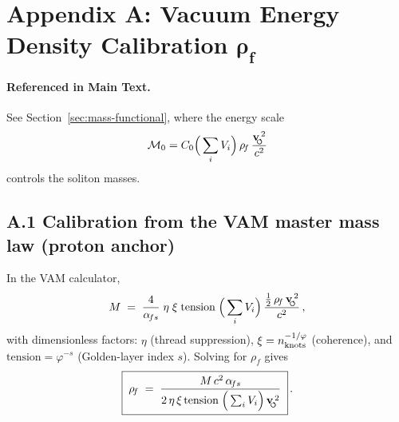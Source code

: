 \documentclass[11pt, preprint,titlepage]{revtex4-2}
\newcommand{\rhoF}{\rho_{\!f}}      %
\newcommand{\swirlarrow}{\!\!\scriptsize\boldsymbol{\circlearrowleft}}
\newcommand{\vswirl}{\mathbf{v}_{\swirlarrow}}
\begin{document}
    
    

    \appendix
	\section*{Appendix A: Vacuum Energy Density Calibration \texorpdfstring{\(\boldsymbol{\rhoF}\)}{rho0}}
	\label{sec:calibration_rho0}

	\paragraph{Referenced in Main Text.}
	See Section~\ref{sec:mass-functional}, where the energy scale
	\[
		\mathcal{M}_0 = C_0 \Big(\sum_i V_i\Big)\,\rhoF\,\frac{\vswirl^{\,2}}{c^2}
	\]
	controls the soliton masses.

	\subsection*{A.1 Calibration from the VAM master mass law (proton anchor)}
	In the VAM calculator,
	\[
		M \;=\; \frac{4}{\alpha_{\!fs}}\;\eta\;\xi\;\text{tension}\;\Big(\sum_i V_i\Big)\,
		\frac{\tfrac12\,\rhoF\,\vswirl^{\,2}}{c^2}\,,
	\]
	with dimensionless factors:
	\(\eta\) (thread suppression), \(\xi=n_{\rm knots}^{-1/\varphi}\) (coherence), and \(\text{tension}=\varphi^{-s}\) (Golden-layer index \(s\)).
	Solving for \(\rhoF\) gives
	\begin{equation}
		\boxed{\;
		\rhoF \;=\; \frac{M\,c^2\,\alpha_{\!fs}}
		{2\,\eta\,\xi\,\text{tension}\;\Big(\sum_i V_i\Big)\,\vswirl^{\,2}}\; } \,.
		\label{eq:rho0-solve}
	\end{equation}
\end{document}
